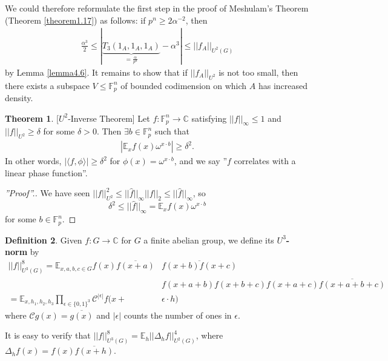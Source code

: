 \documentclass{article}
\theoremstyle{definition}
\newtheorem{theorem}{Theorem}[section]
\newtheorem{defn}[theorem]{Definition}
\begin{document}
We could therefore reformulate the first step in the proof of Meshulam's Theorem (Theorem \ref{theorem1.17}) as follows: if $p^n\ge 2\alpha^{-2}$, then 
\begin{align*}
   \frac{\alpha^3}{2}\le |\underbrace{T_3(1_A,1_A,1_A)}_{=\frac{\alpha}{p^n}}-\alpha^3| \le ||f_A||_{U^2(G)}
\end{align*}
by Lemma \ref{lemma4.6}. It remains to show that if $||f_A||_{U^2}$ is not too small, then there exists a subspace $V \le \mathbb{F}_p^n$ of bounded codimension on which $A$ has increased density.
\begin{theorem}\label{theorem4.7}[$U^2$-Inverse Theorem]
    Let $f : \mathbb{F}_p^n \to \mathbb{C}$ satisfying $||f||_{\infty}\le 1$ and $||f||_{U^2}\ge \delta$ for some $\delta>0$. Then $\exists b \in \mathbb{F}_p^n$ such that 
    \begin{align*}
        \left|\mathbb{E}_{x} f(x)\omega^{x\cdot b}\right| \ge \delta^2.
    \end{align*}
    In other words, $\left|\langle f, \phi \rangle\right|\ge \delta^2$ for $\phi(x)=\omega^{x\cdot b}$, and we say ''$f$ correlates with a linear phase function''.
\end{theorem}
\begin{proof}[''Proof''.]
    We have seen $||f||_{U^2}^2 \le ||\widehat{f}||_{\infty}||f||_2 \le ||\widehat{f}||_{\infty}$, so \[
    \delta^2 \le ||\widehat{f}||_{\infty} = \mathbb{E}_x f(x)\omega^{x\cdot b}
    \]
    for some $b \in \mathbb{F}_p^n$.
\end{proof}
\begin{defn}\label{defn4.8}
    Given $f : G \to \mathbb{C}$ for $G$ a finite abelian group, we define its \textbf{$U^3$-norm} by 
    \begin{align*}
        ||f||_{U^3(G)}^8 = \mathbb{E}_{x,a,b,c \in G}f(x)\overline{f(x+a)}&\overline{f(x+b)f(x+c)}\\
        &f(x+a+b)f(x+b+c)f(x+a+c)\overline{f(x+a+b+c)}\\
        = \mathbb{E}_{x,h_1,h_2,h_3} \prod_{\epsilon \in \{0,1\}^3}^{} \mathcal{C}^{\left|\epsilon\right|}f(x+&\epsilon\cdot h)
    \end{align*}
    where $\mathcal{C}g(x) = \overline{g(x)}$ and $\left|\epsilon\right|$ counts the number of ones in $\epsilon$.
\end{defn}

It is easy to verify that $||f||_{U^3(G)}^8 = \mathbb{E}_{h}||\Delta_h f||_{U^2(G)}^4$, where $\Delta_h f(x) = f(x)\overline{f(x+h)}$.
\end{document}
